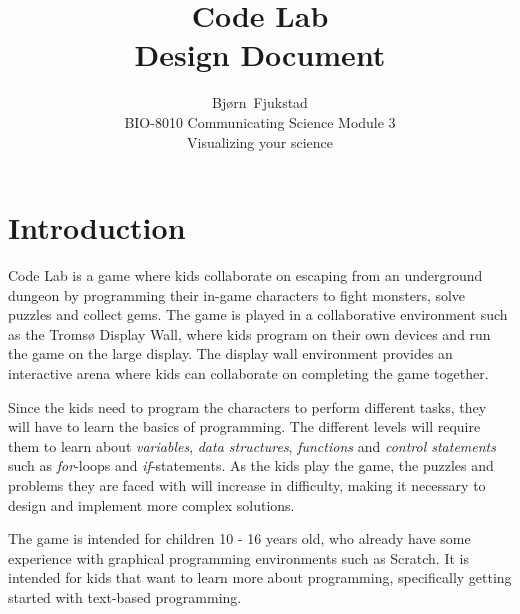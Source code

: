 \documentclass[12pt,journal,compsoc]{IEEEtran}
\begin{document}
\title{Code Lab \\ Design Document}

\author{Bjørn~Fjukstad \\ BIO-8010 Communicating Science Module 3\\ Visualizing
your science} 

\maketitle
\vspace{-15mm}

\section{Introduction} 
Code Lab is a game where kids collaborate on escaping from an underground
dungeon by programming their in-game characters to fight monsters, solve puzzles
and collect gems. The game is played in a collaborative environment such as the
Tromsø Display Wall\cite{anshus2013nineyears}, where kids program on their own
devices and run the game on the large display. The display wall environment
provides an interactive arena where kids can collaborate on completing the game
together.

Since the kids need to program the characters to perform different tasks, they
will have to learn the basics of programming. The different levels will require
them to learn about \emph{variables}, \emph{data structures}, \emph{functions}
and \emph{control statements} such as \emph{for}-loops and \emph{if}-statements. 
As the kids play the game, the puzzles and problems they are faced with will
increase in difficulty, making it necessary to design and implement more
complex solutions. 

The game is intended for children 10 - 16 years old, who already have some
experience with graphical programming environments such as
Scratch\cite{resnick2009scratch}. It is intended for kids that want to learn
more about programming, specifically getting started with text-based
programming. 



\end{document}
